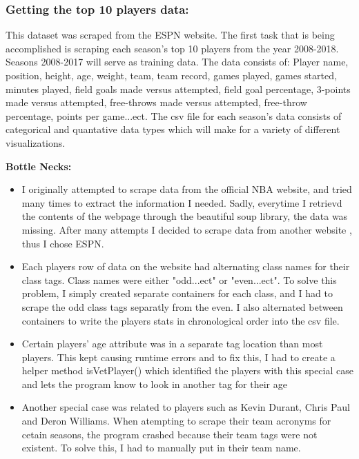 \documentclass[11pt]{article}
\begin{document}
\subsubsection{Getting the top 10 players
data:}\label{getting-the-top-10-players-data}

This dataset was scraped from the ESPN website. The first task that is
being accomplished is scraping each season's top 10 players from the
year 2008-2018. Seasons 2008-2017 will serve as training data. The data
consists of: Player name, position, height, age, weight, team, team
record, games played, games started, minutes played, field goals made
versus attempted, field goal percentage, 3-points made versus attempted,
free-throws made versus attempted, free-throw percentage, points per
game...ect. The csv file for each season's data consists of categorical
and quantative data types which will make for a variety of different
visualizations.

\textbf{Bottle Necks:}

\begin{itemize}
\item
  I originally attempted to scrape data from the official NBA website,
  and tried many times to extract the information I needed. Sadly,
  everytime I retrievd the contents of the webpage through the beautiful
  soup library, the data was missing. After many attempts I decided to
  scrape data from another website , thus I chose ESPN.
\item
  Each players row of data on the website had alternating class names
  for their class tags. Class names were either "odd...ect" or
  "even...ect". To solve this problem, I simply created separate
  containers for each class, and I had to scrape the odd class tags
  separatly from the even. I also alternated between containers to write
  the players stats in chronological order into the csv file.
\item
  Certain players' age attribute was in a separate tag location than
  most players. This kept causing runtime errors and to fix this, I had
  to create a helper method isVetPlayer() which identified the players
  with this special case and lets the program know to look in another
  tag for their age
\item
  Another special case was related to players such as Kevin Durant,
  Chris Paul and Deron Williams. When atempting to scrape their team
  acronyms for cetain seasons, the program crashed because their team
  tags were not existent. To solve this, I had to manually put in their
  team name.
\end{itemize}
\end{document}
